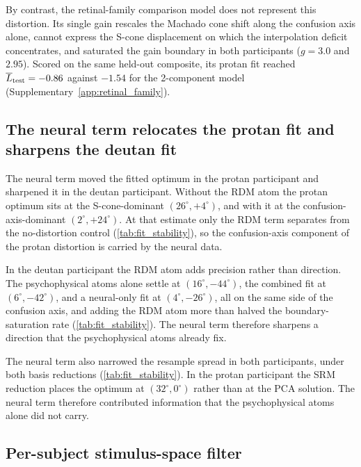 By contrast, the retinal-family comparison model does not represent this distortion. Its single gain rescales the Machado cone shift along the confusion axis alone, cannot express the S-cone displacement on which the interpolation deficit concentrates, and saturated the gain boundary in both participants ($g = 3.0$ and $2.95$). Scored on the same held-out composite, its protan fit reached $\overline{L}_{\rm test} = -0.86$ against $-1.54$ for the 2-component model (Supplementary~\cref{app:retinal_family}).


\subsection{The neural term relocates the protan fit and sharpens the deutan fit}
\label{sec:results:neural_role}

The neural term moved the fitted optimum in the protan participant and sharpened it in the deutan participant. Without the RDM atom the protan optimum sits at the S-cone-dominant $(26^\circ, +4^\circ)$, and with it at the confusion-axis-dominant $(2^\circ, +24^\circ)$. At that estimate only the RDM term separates from the no-distortion control (\cref{tab:fit_stability}), so the confusion-axis component of the protan distortion is carried by the neural data.

In the deutan participant the RDM atom adds precision rather than direction. The psychophysical atoms alone settle at $(16^\circ, -44^\circ)$, the combined fit at $(6^\circ, -42^\circ)$, and a neural-only fit at $(4^\circ, -26^\circ)$, all on the same side of the confusion axis, and adding the RDM atom more than halved the boundary-saturation rate (\cref{tab:fit_stability}). The neural term therefore sharpens a direction that the psychophysical atoms already fix.

The neural term also narrowed the resample spread in both participants, under both basis reductions (\cref{tab:fit_stability}). In the protan participant the SRM reduction places the optimum at $(32^\circ, 0^\circ)$ rather than at the PCA solution. The neural term therefore contributed information that the psychophysical atoms alone did not carry.

\subsection{Per-subject stimulus-space filter}
\label{sec:results:filter}

